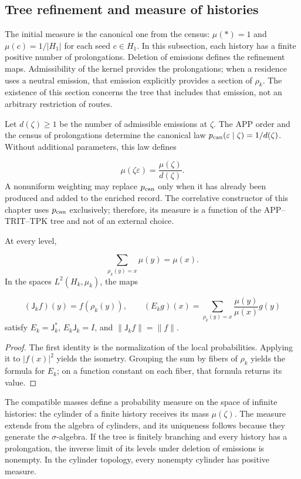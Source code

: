 \subsection{Tree refinement and measure of histories}
The initial measure is the canonical one from the census: \(\mu(\ast)=1\) and
\(\mu(c)=1/|H_1|\) for each seed \(c\in H_1\). In this subsection, each
history has a finite positive number of prolongations. Deletion of
emissions defines the refinement maps. Admissibility of the kernel
provides the prolongations; when a residence uses a neutral emission,
that emission explicitly provides a section of \(\rho_k\). The existence of this
section concerns the tree that includes that emission, not an arbitrary
restriction of routes.

Let \(d(\zeta)\geq1\) be the number of admissible emissions at \(\zeta\). The
APP order and the census of prolongations determine the canonical law
\(p_{\rm can}(\varepsilon\mid\zeta)=1/d(\zeta)\). Without additional
parameters, this law defines

\[
\mu(\zeta\varepsilon)=\frac{\mu(\zeta)}{d(\zeta)}.
\]
A nonuniform weighting may replace \(p_{\rm can}\) only when it has already
been produced and added to the enriched record. The correlative constructor
of this chapter uses \(p_{\rm can}\) exclusively; therefore, its measure
is a function of the APP--TRIT--TPK tree and not of an external choice.

\begin{proposition}
\label{prop:continuo-esperanza-condicional}
At every level,

\[
\sum_{\rho_k(y)=x}\mu(y)=\mu(x).
\]
In the spaces \(L^2(H_k,\mu_k)\), the maps

\[
(\mathsf J_kf)(y)=f(\rho_k(y)),
\qquad
(E_kg)(x)=\sum_{\rho_k(y)=x}\frac{\mu(y)}{\mu(x)}g(y)
\]
satisfy \(E_k=\mathsf J_k^*\), \(E_k\mathsf J_k=I\), and \(\|\mathsf J_kf\|=\|f\|\).
\end{proposition}
\begin{proof}
The first identity is the normalization of the local probabilities. Applying it to \(|f(x)|^2\) yields the isometry. Grouping the sum by fibers of \(\rho_k\) yields the formula for \(E_k\); on a function constant on each fiber, that formula returns its value.
\end{proof}

The compatible masses define a probability measure on the space of infinite histories: the cylinder of a finite history receives its mass \(\mu(\zeta)\). The measure extends from the algebra of cylinders, and its uniqueness follows because they generate the \(\sigma\)-algebra. If the tree is finitely branching and every history has a prolongation, the inverse limit of its levels under deletion of emissions is nonempty. In the cylinder topology, every nonempty cylinder has positive measure.

